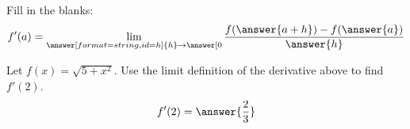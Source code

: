 \documentclass{ximera}
\begin{document}
\begin{exercise}

Fill in the blanks:
  \[
  f'(a)=\lim_{\answer[format=string,id=h]{h}\to\answer[{0}}\frac{f(\answer{a+h})-f(\answer{a})}{\answer{h}}
  \]
    
    
  \begin{exercise}
    Let $f(x)=\sqrt{5+x^2}$. Use the limit definition of the derivative
    above to find $f'(2)$.
    \[
    f'(2)=\answer{\frac{2}{3}}
    \]
  \end{exercise}
\end{exercise}
\end{document}

